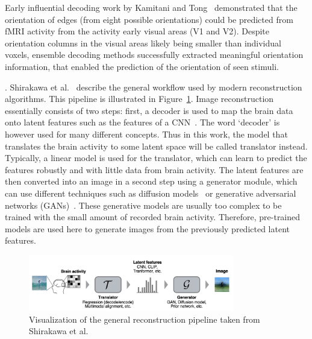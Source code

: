 Early influential decoding work by Kamitani and Tong~\cite{kamitaniDecodingVisualSubjective2005} demonstrated that the orientation of edges (from eight possible orientations) could be predicted from fMRI activity from the activity early visual areas (V1 and V2). Despite orientation columns in the visual areas likely being smaller than individual voxels, ensemble decoding methods successfully extracted meaningful orientation information, that enabled the prediction of the orientation of seen stimuli. 


. 
Shirakawa et al.~\cite{shirakawaSpuriousReconstructionBrain2024} describe the general workflow used by modern reconstruction algorithms. This pipeline is illustrated in Figure~\ref{fig:recon_pipeline}. Image reconstruction essentially consists of two steps: first, a decoder is used to map the brain data onto latent features such as the features of a CNN~\cite{horikawaGenericDecodingSeen2017}. The word `decoder' is however used for many different concepts. Thus in this work, the model that translates the brain activity to some latent space will be called translator instead. 
Typically, a linear model is used for the translator, which can learn to predict the features robustly and with little data from brain activity. 
The latent features are then converted into an image in a second step using a generator module, which can use different techniques such as diffusion models~\cite{xuVersatileDiffusionText2024,ozcelikNaturalSceneReconstruction2023} or generative adversarial networks (GANs)~\cite{chengReconstructingVisualIllusory2023}. These generative models are usually too complex to be trained with the small amount of recorded brain activity. Therefore, pre-trained models are used here to generate images from the previously predicted latent features.

\begin{figure}[ht]
    \centering
    \includegraphics[width=0.8\textwidth]{plots/01_background_shirakawa_recon_pipeline.png}
    \caption[General reconstruction pipeline]{Visualization of the general reconstruction pipeline taken from Shirakawa et al.~\cite{shirakawaSpuriousReconstructionBrain2024}}\label{fig:recon_pipeline}
\end{figure}


